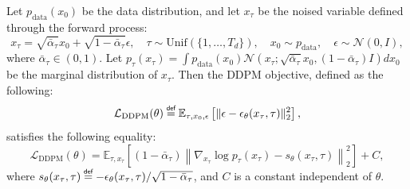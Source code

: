 \begin{theorem}
\label{thm:score_matching_ddpm}
Let $p_{\text{data}}(x_0)$ be the data distribution, and let $x_\tau$ be the noised variable defined through the forward process:
\begin{equation}
x_\tau = \sqrt{\bar{\alpha}_\tau}x_0 + \sqrt{1 - \bar{\alpha}_\tau}\epsilon, \quad \tau \sim \mathrm{Unif}(\{1, \ldots, T_d\}), \quad x_0 \sim p_{\text{data}}, \quad \epsilon \sim \mathcal{N}(0, I),
\end{equation}
where $\bar{\alpha}_\tau \in (0,1)$. Let $p_\tau(x_\tau) = \int p_{\text{data}}(x_0) \mathcal{N}(x_\tau; \sqrt{\bar{\alpha}_\tau}x_0, (1 - \bar{\alpha}_\tau)I) dx_0$ be the marginal distribution of $x_\tau$. Then the DDPM objective, defined as the following:
\begin{equation}\label{eq:ddpm_loss}
\mathcal{L}_\text{DDPM}(\theta) \myeq \mathbb{E}_{\tau, x_0, \epsilon} \left[ \|\epsilon - \epsilon_\theta(x_\tau, \tau)\|_2^2 \right],
\end{equation}
satisfies the following equality:
\begin{equation}
\mathcal{L}_\text{DDPM}(\theta) = \mathbb{E}_{\tau, x_\tau} \left[ (1 - \bar{\alpha}_\tau) \left\| \nabla_{x_\tau} \log p_\tau(x_\tau) - s_\theta(x_\tau, \tau) \right\|_2^2 \right] + C,
\end{equation}
where $s_\theta(x_\tau, \tau) \myeq -\epsilon_\theta(x_\tau, \tau)/\sqrt{1 - \bar{\alpha}_\tau}$, and $C$ is a constant independent of $\theta$.
\end{theorem}

